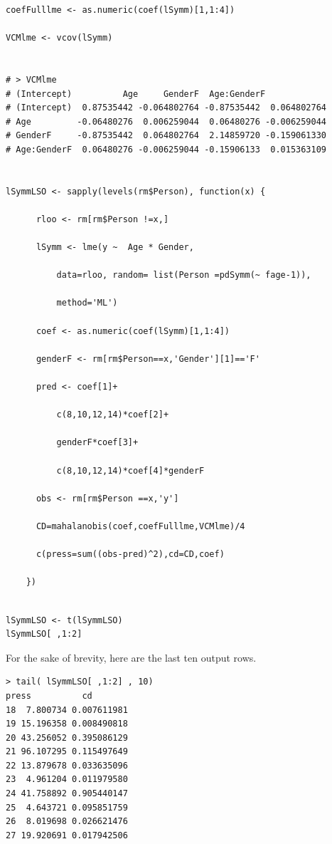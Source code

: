 \documentclass[a4paper,12pt]{article}
\begin{document}
\begin{framed}
\begin{verbatim}
coefFulllme <- as.numeric(coef(lSymm)[1,1:4])

VCMlme <- vcov(lSymm)


# > VCMlme
# (Intercept)          Age     GenderF  Age:GenderF
# (Intercept)  0.87535442 -0.064802764 -0.87535442  0.064802764
# Age         -0.06480276  0.006259044  0.06480276 -0.006259044
# GenderF     -0.87535442  0.064802764  2.14859720 -0.159061330
# Age:GenderF  0.06480276 -0.006259044 -0.15906133  0.015363109


lSymmLSO <- sapply(levels(rm$Person), function(x) {

      rloo <- rm[rm$Person !=x,]

      lSymm <- lme(y ~  Age * Gender,

          data=rloo, random= list(Person =pdSymm(~ fage-1)),

          method='ML')

      coef <- as.numeric(coef(lSymm)[1,1:4])

      genderF <- rm[rm$Person==x,'Gender'][1]=='F'

      pred <- coef[1]+

          c(8,10,12,14)*coef[2]+

          genderF*coef[3]+

          c(8,10,12,14)*coef[4]*genderF

      obs <- rm[rm$Person ==x,'y']

      CD=mahalanobis(coef,coefFulllme,VCMlme)/4

      c(press=sum((obs-pred)^2),cd=CD,coef)

    })
    
\end{verbatim}
\end{framed}

\newpage

\begin{framed}
\begin{verbatim}
lSymmLSO <- t(lSymmLSO)
lSymmLSO[ ,1:2]
\end{verbatim}
\end{framed}
For the sake of brevity, here are the last ten output rows.
\begin{framed}
	\begin{verbatim}
> tail( lSymmLSO[ ,1:2] , 10)
press          cd
18  7.800734 0.007611981
19 15.196358 0.008490818
20 43.256052 0.395086129
21 96.107295 0.115497649
22 13.879678 0.033635096
23  4.961204 0.011979580
24 41.758892 0.905440147
25  4.643721 0.095851759
26  8.019698 0.026621476
27 19.920691 0.017942506

\end{verbatim}
\end{framed}
\end{document}
